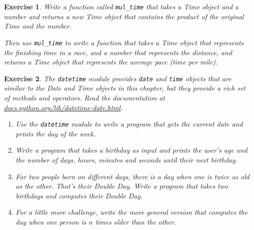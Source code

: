 \documentclass[12pt,a4paper,final,twoside,onecolumn,titlepage]{book}
\newtheorem{exercise}{Exercise}[chapter]
\begin{document}
\begin{exercise}

Write a function called \verb"mul_time" that takes a Time object
and a number and returns a new Time object that contains
the product of the original Time and the number.

Then use \verb"mul_time" to write a function that takes a Time
object that represents the finishing time in a race, and a number
that represents the distance, and returns a Time object that represents
the average pace (time per mile).

\end{exercise}





\begin{exercise}

The {\tt datetime} module provides {\tt date} and {\tt time} objects
that are similar to the Date and Time objects in this chapter, but
they provide a rich set of methods and operators.  Read the
documentation at \url{docs.python.org/lib/datetime-date.html}.

\begin{enumerate}

\item Use the {\tt datetime} module to write a program that gets the
  current date and prints the day of the week.

\item Write a program that takes a birthday as input and prints the
  user's age and the number of days, hours, minutes and seconds until
  their next birthday.

\item For two people born on different days, there is a day when one
  is twice as old as the other. That's their Double Day.  Write a
  program that takes two birthdays and computes their Double Day.

\item For a little more challenge, write the more general version that
  computes the day when one person is $n$ times older than the other.

\end{enumerate}

\end{exercise}
\end{document}
